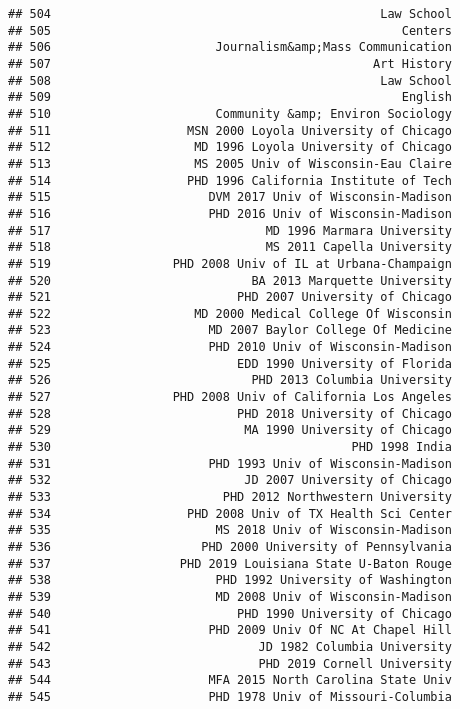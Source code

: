 \documentclass[
]{article}
\begin{document}
\begin{verbatim}
## 504                                              Law School
## 505                                                 Centers
## 506                       Journalism&amp;Mass Communication
## 507                                             Art History
## 508                                              Law School
## 509                                                 English
## 510                       Community &amp; Environ Sociology
## 511                   MSN 2000 Loyola University of Chicago
## 512                    MD 1996 Loyola University of Chicago
## 513                    MS 2005 Univ of Wisconsin-Eau Claire
## 514                   PHD 1996 California Institute of Tech
## 515                      DVM 2017 Univ of Wisconsin-Madison
## 516                      PHD 2016 Univ of Wisconsin-Madison
## 517                              MD 1996 Marmara University
## 518                              MS 2011 Capella University
## 519                 PHD 2008 Univ of IL at Urbana-Champaign
## 520                            BA 2013 Marquette University
## 521                          PHD 2007 University of Chicago
## 522                    MD 2000 Medical College Of Wisconsin
## 523                      MD 2007 Baylor College Of Medicine
## 524                      PHD 2010 Univ of Wisconsin-Madison
## 525                          EDD 1990 University of Florida
## 526                            PHD 2013 Columbia University
## 527                 PHD 2008 Univ of California Los Angeles
## 528                          PHD 2018 University of Chicago
## 529                           MA 1990 University of Chicago
## 530                                          PHD 1998 India
## 531                      PHD 1993 Univ of Wisconsin-Madison
## 532                           JD 2007 University of Chicago
## 533                        PHD 2012 Northwestern University
## 534                   PHD 2008 Univ of TX Health Sci Center
## 535                       MS 2018 Univ of Wisconsin-Madison
## 536                     PHD 2000 University of Pennsylvania
## 537                  PHD 2019 Louisiana State U-Baton Rouge
## 538                       PHD 1992 University of Washington
## 539                       MD 2008 Univ of Wisconsin-Madison
## 540                          PHD 1990 University of Chicago
## 541                      PHD 2009 Univ Of NC At Chapel Hill
## 542                             JD 1982 Columbia University
## 543                             PHD 2019 Cornell University
## 544                      MFA 2015 North Carolina State Univ
## 545                      PHD 1978 Univ of Missouri-Columbia

\end{verbatim}
\end{document}
